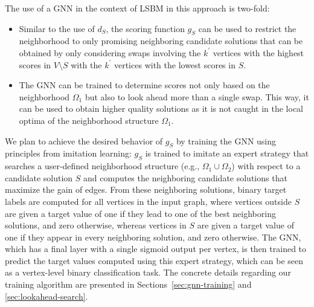 \documentclass[draft,final]{vutinfth} %
\begin{document}
The use of a GNN in the context of LSBM in this approach is two-fold: 
\begin{itemize}
    \item Similar to the use of $d_S$, the scoring function $g_S$ can be used to restrict the neighborhood to only promising neighboring candidate solutions that can be obtained by only considering swaps involving the $k^\prime$ vertices with the highest scores in $V \setminus S$ with the $k^\prime$ vertices with the lowest scores in $S$. 
    \item The GNN can be trained to determine scores not only based on the neighborhood $\Omega_1$ but also to look ahead more than a single swap. This way, it can be used to obtain higher quality solutions as it is not caught in the local optima of the neighborhood structure $\Omega_1$.
\end{itemize}

We plan to achieve the desired behavior of $g_S$ by training the GNN using principles from imitation learning: 
$g_S$ is trained to imitate an expert strategy that searches a user-defined neighborhood structure (e.g., $\Omega_1 \cup \Omega_2$) with respect to a candidate solution $S$ and computes the neighboring candidate solutions that maximize the gain of edges. From these neighboring solutions, binary target labels are computed for all vertices in the input graph, where vertices outside $S$ are given a target value of one if they lead to one of the best neighboring solutions, and zero otherwise, whereas vertices in $S$ are given a target value of one if they appear in every neighboring solution, and zero otherwise. 
The GNN, which has a final layer with a single sigmoid output per vertex, is then trained to predict the target values computed using this expert strategy, which can be seen as a vertex-level binary classification task. The concrete details regarding our training algorithm are presented in Sections~\ref{sec:gnn-training} and \ref{sec:lookahead-search}.
\end{document}
